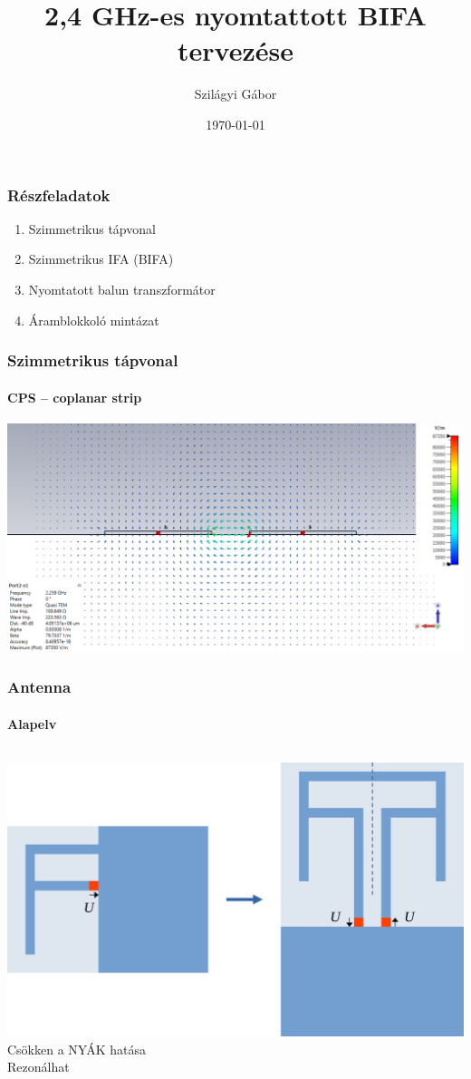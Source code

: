 \documentclass[aspectratio=169]{beamer}
\title{2,4 GHz-es nyomtattott BIFA tervezése}			%
\subtitle{} 	%
\date{\today}
\author{Szilágyi Gábor}	%
\institute{Silicon Laboratories} %
\begin{document}
\maketitle	%
\begin{frame}
	\frametitle{Részfeladatok}
			\begin{enumerate}
				\item<0-3> Szimmetrikus tápvonal \\[1.5ex]
				\item<0-3> Szimmetrikus IFA (BIFA) \\[1.5ex]
				\item<0-2> Nyomtatott balun transzformátor \\[1.5ex]
				\item<0-1> Áramblokkoló mintázat
			\end{enumerate}
\end{frame}
\begin{frame}
	\frametitle{Szimmetrikus tápvonal}
	\framesubtitle{CPS -- coplanar strip}
	\centering
	\includegraphics[width=\textwidth]{e1_2.png}
\end{frame}
\begin{frame}
	\frametitle{Antenna}
	\framesubtitle{Alapelv}
	\begin{columns}	
			\includegraphics[width=\textwidth]{ifa-bifa.pdf}
			Csökken a NYÁK hatása\\[2ex]
			Rezonálhat
	\end{columns}
\end{frame}
\end{document}
